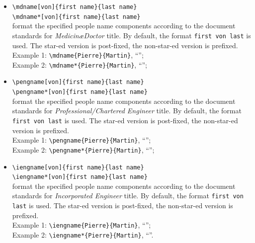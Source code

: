 \documentclass[book,taskpackage,specpackage,codepackage]{upmethodology-document}
\begin{document}
\begin{itemize}
      \texttt{{\textbackslash}scdname*[von]\{first name\}\{last name\}} \\
	format the specified people name components according to the document standards for \emph{Scienti\ae Doctor} title. By default, the format \texttt{first von last} is used. The star-ed version is post-fixed, the non-star-ed version is prefixed. \\
	Example 1: \texttt{{\textbackslash}scdname\{Pierre\}\{Martin\}}, ``''; \\
	Example 2: \texttt{{\textbackslash}scdname*\{Pierre\}\{Martin\}}, ``'';
\item \texttt{{\textbackslash}mdname[von]\{first name\}\{last name\}} \\
      \texttt{{\textbackslash}mdname*[von]\{first name\}\{last name\}} \\
	format the specified people name components according to the document standards for \emph{Medicin\ae Doctor} title. By default, the format \texttt{first von last} is used. The star-ed version is post-fixed, the non-star-ed version is prefixed. \\
	Example 1: \texttt{{\textbackslash}mdname\{Pierre\}\{Martin\}}, ``''; \\
	Example 2: \texttt{{\textbackslash}mdname*\{Pierre\}\{Martin\}}, ``'';
\item \texttt{{\textbackslash}pengname[von]\{first name\}\{last name\}} \\
      \texttt{{\textbackslash}pengname*[von]\{first name\}\{last name\}} \\
	format the specified people name components according to the document standards for \emph{Professional/Chartered Engineer} title. By default, the format \texttt{first von last} is used. The star-ed version is post-fixed, the non-star-ed version is prefixed. \\
	Example 1: \texttt{{\textbackslash}pengname\{Pierre\}\{Martin\}}, ``''; \\
	Example 2: \texttt{{\textbackslash}pengname*\{Pierre\}\{Martin\}}, ``'';
\item \texttt{{\textbackslash}iengname[von]\{first name\}\{last name\}} \\
      \texttt{{\textbackslash}iengname*[von]\{first name\}\{last name\}} \\
	format the specified people name components according to the document standards for \emph{Incorporated Engineer} title. By default, the format \texttt{first von last} is used. The star-ed version is post-fixed, the non-star-ed version is prefixed. \\
	Example 1: \texttt{{\textbackslash}iengname\{Pierre\}\{Martin\}}, ``''; \\
	Example 2: \texttt{{\textbackslash}iengname*\{Pierre\}\{Martin\}}, ``''.
\end{itemize}
\end{document}
